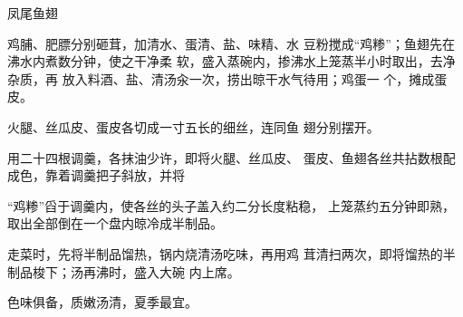 \begin{recipe}{凤尾鱼翅}

\ingredients




\cooking

\step 鸡脯、肥膘分别砸茸，加清水、蛋清、盐、味精、水 豆粉搅成“鸡糁”；鱼翅先在沸水内煮数分钟，使之干净柔 软，盛入蒸碗内，掺沸水上笼蒸半小时取出，去净杂质，再 放入料酒、盐、清汤汆一次，捞出晾干水气待用；鸡蛋一 个，摊成蛋皮。

\step 火腿、丝瓜皮、蛋皮各切成一寸五长的细丝，连同鱼 翅分别摆开。

\step 	用二十四根调羹，各抹油少许，即将火腿、丝瓜皮、 蛋皮、鱼翅各丝共拈数根配成色，靠着调羹把子斜放，并将

“鸡糁”舀于调羹内，使各丝的头子盖入约二分长度粘稳， 上笼蒸约五分钟即熟，取出全部倒在一个盘内晾冷成半制品。

\step 	走菜时，先将半制品馏热，锅内烧清汤吃味，再用鸡 茸清扫两次，即将馏热的半制品梭下；汤再沸时，盛入大碗 内上席。

\notes

色味俱备，质嫩汤清，夏季最宜。

\end{recipe}

